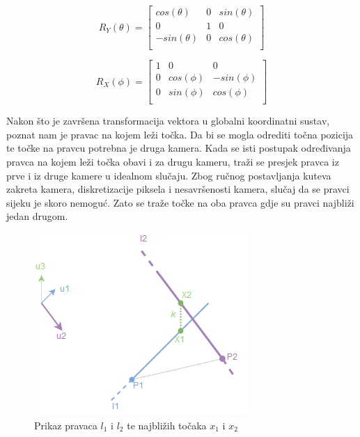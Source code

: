 \documentclass[times, utf8, diplomski]{fer}
\begin{document}
\begin{equation}
	R_{Y}(\theta) = 
	\begin{bmatrix}
		cos(\theta) & 0 & sin(\theta) \\
		0 & 1 & 0 \\
		-sin(\theta) & 0 & cos(\theta) \\
	\end{bmatrix}
\end{equation}

\begin{equation}
	R_{X}(\phi) = 
	\begin{bmatrix}
		1 & 0 & 0 \\
		0 & cos(\phi) & -sin(\phi) \\
		0 & sin(\phi) & cos(\phi) \\
	\end{bmatrix}
\end{equation}

\vspace{5mm}

Nakon što je završena transformacija vektora u globalni koordinatni sustav, poznat nam je pravac na kojem leži točka. Da bi se mogla odrediti točna pozicija te točke na pravcu potrebna je druga kamera. Kada se isti postupak određivanja pravca na kojem leži točka obavi i za drugu kameru, traži se presjek pravca iz prve i iz druge kamere u idealnom slučaju. Zbog ručnog postavljanja kuteva zakreta kamera, diskretizacije piksela i nesavršenosti kamera, slučaj da se pravci sijeku je skoro nemoguć. Zato se traže točke na oba pravca gdje su pravci najbliži jedan drugom.

\begin{figure}[h]
\centering
\includegraphics[width=.5\textwidth]{skew-lines}
\caption{Prikaz pravaca $l_1$ i $l_2$ te najbližih točaka $x_1$ i $x_2$ \protect\footnotemark}
\label{fig:skew-lines}
\end{figure}
\end{document}
